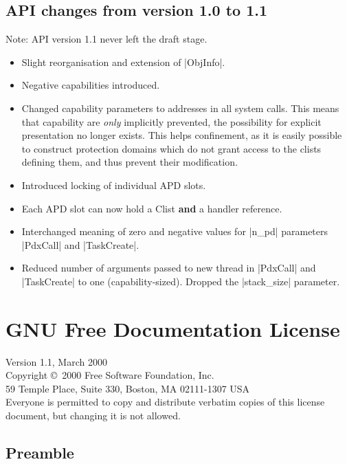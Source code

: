 \documentclass[a4paper,11pt,twoside,dvips]{report}
\begin{document}
\section{API changes from version 1.0 to 1.1}
Note: API version 1.1 never left the draft stage.
\begin{itemize}
\item Slight reorganisation and extension of |ObjInfo|.

\item Negative capabilities introduced.

\item Changed capability parameters to addresses in all system
calls. This means that capability are \emph{only} implicitly prevented,
the possibility for explicit presentation no longer exists. This helps
confinement, as it is easily possible to construct protection domains
which do not grant access to the clists defining them, and thus prevent
their modification.

\item Introduced locking of individual APD slots.

\item Each APD slot can now hold a Clist \textbf{and} a handler reference.

\item Interchanged meaning of zero and negative values for |n\_pd|
parameters |PdxCall| and |TaskCreate|.

\item Reduced number of arguments passed to new thread in |PdxCall| and
|TaskCreate| to one (capability-sized). Dropped the |stack\_size|
parameter.
\end{itemize}

\chapter{\label{a:license}GNU Free Documentation License}

Version 1.1, March 2000\\

 Copyright \copyright\ 2000  Free Software Foundation, Inc.\\
     59 Temple Place, Suite 330, Boston, MA  02111-1307  USA\\
 Everyone is permitted to copy and distribute verbatim copies
 of this license document, but changing it is not allowed.

\section*{Preamble}
\end{document}
